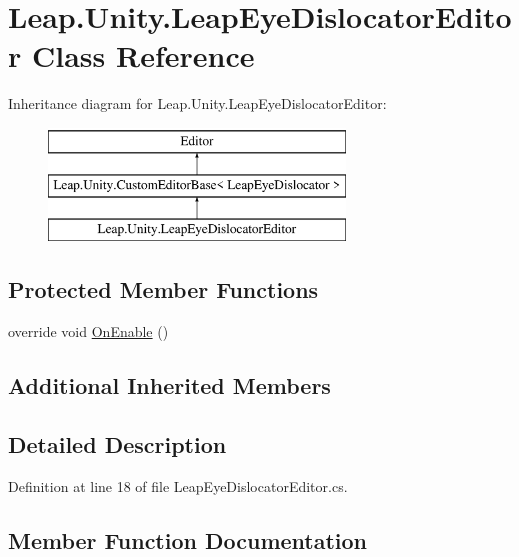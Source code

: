 \hypertarget{class_leap_1_1_unity_1_1_leap_eye_dislocator_editor}{}\section{Leap.\+Unity.\+Leap\+Eye\+Dislocator\+Editor Class Reference}
\label{class_leap_1_1_unity_1_1_leap_eye_dislocator_editor}
Inheritance diagram for Leap.\+Unity.\+Leap\+Eye\+Dislocator\+Editor\+:\begin{figure}[H]
\begin{center}
\leavevmode
\includegraphics[height=3.000000cm]{class_leap_1_1_unity_1_1_leap_eye_dislocator_editor}
\end{center}
\end{figure}
\subsection*{Protected Member Functions}
\begin{DoxyCompactItemize}
\item 
override void \mbox{\hyperlink{class_leap_1_1_unity_1_1_leap_eye_dislocator_editor_af54aeda476de3d9c43e76e6b4365121b}{On\+Enable}} ()
\end{DoxyCompactItemize}
\subsection*{Additional Inherited Members}


\subsection{Detailed Description}


Definition at line 18 of file Leap\+Eye\+Dislocator\+Editor.\+cs.



\subsection{Member Function Documentation}
\mbox{\label{class_leap_1_1_unity_1_1_leap_eye_dislocator_editor_af54aeda476de3d9c43e76e6b4365121b}} 
